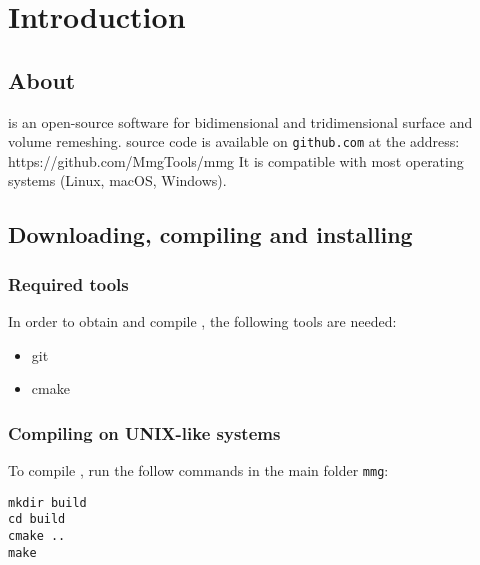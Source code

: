 \chapter{Introduction}

\section{About \mmg}

\mmg{} is an open-source software for bidimensional and tridimensional
surface and volume remeshing. 
\mmg{} source code is available on \texttt{github.com} at the address:
https://github.com/MmgTools/mmg
It is compatible with most operating systems (Linux, macOS, Windows).

\section{Downloading, compiling and installing \mmg}

\subsection{Required tools}

In order to obtain and compile \mmg{}, the following tools are needed:

\begin{itemize}
  \item git
  \item cmake
\end{itemize}

\subsection{Compiling on UNIX-like systems}

To compile \mmg{}, run the follow commands in the main folder \texttt{mmg}:

\begin{verbatim}
mkdir build
cd build
cmake ..
make
\end{verbatim}
